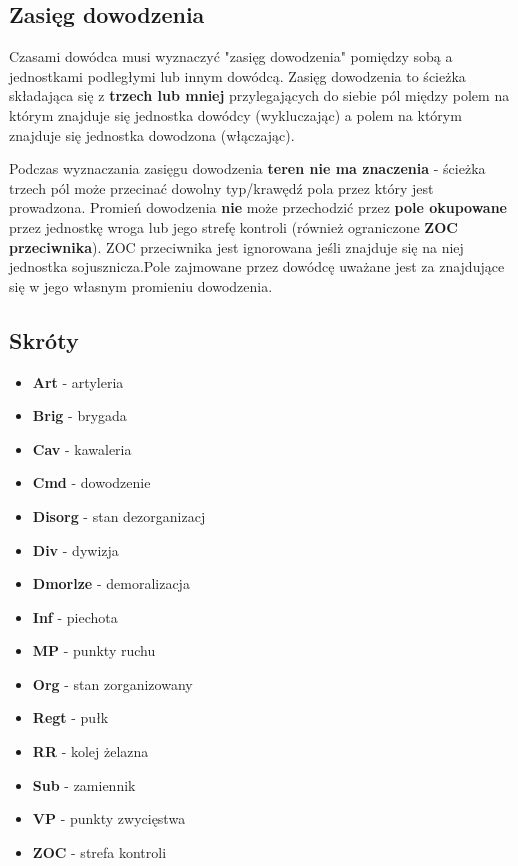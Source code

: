 \subsection{Zasięg dowodzenia}
Czasami dowódca musi wyznaczyć "zasięg dowodzenia" pomiędzy sobą a jednostkami podległymi lub innym dowódcą. Zasięg dowodzenia to ścieżka składająca się z \textbf{trzech lub mniej} przylegających do siebie pól między polem na którym znajduje się jednostka dowódcy (wykluczając) a polem na którym znajduje się jednostka dowodzona (włączając).\par
Podczas wyznaczania zasięgu dowodzenia \textbf{teren nie ma znaczenia} - ścieżka trzech pól może przecinać dowolny typ/krawędź pola przez który jest prowadzona. Promień dowodzenia \textbf{nie} może przechodzić przez \textbf{pole okupowane} przez jednostkę wroga lub jego strefę kontroli (również ograniczone \textbf{ZOC przeciwnika}). ZOC przeciwnika jest ignorowana jeśli znajduje się na niej jednostka sojusznicza.Pole zajmowane przez dowódcę uważane jest za znajdujące się w jego własnym promieniu dowodzenia.

\subsection{Skróty}
\begin{itemize}
    \item[] \textbf{Art} - artyleria
    \item[] \textbf{Brig} - brygada
    \item[] \textbf{Cav} - kawaleria
    \item[] \textbf{Cmd} - dowodzenie
    \item[] \textbf{Disorg} - stan dezorganizacj
    \item[] \textbf{Div} - dywizja
    \item[] \textbf{Dmorlze} - demoralizacja
    \item[] \textbf{Inf} - piechota
    \item[] \textbf{MP} - punkty ruchu
    \item[] \textbf{Org} - stan zorganizowany
    \item[] \textbf{Regt} - pułk
    \item[] \textbf{RR} - kolej żelazna
    \item[] \textbf{Sub} - zamiennik
    \item[] \textbf{VP} - punkty zwycięstwa
    \item[] \textbf{ZOC} - strefa kontroli
\end{itemize}